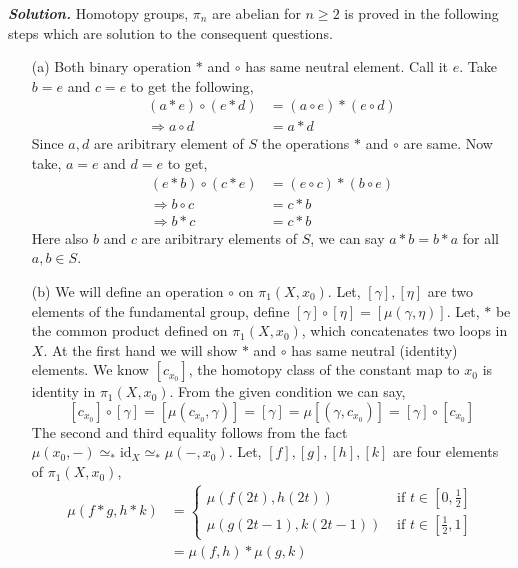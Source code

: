 \documentclass[11pt]{article}
\newcommand{\sol}{ \textbf{\textit{Solution.}} }
\newcommand{\id}{\mathrm{id}}
\begin{document}
 \sol Homotopy groups, $\pi_n$ are abelian for $n \geq 2$ is proved in the following steps which are solution to the consequent questions.

 \begin{itemize}
    \item[(a)] Both binary operation $\ast$ and $\circ$ has same neutral element. Call it $e$. Take $b = e$ and $c=e$ to get the following, 
    \begin{align*}
        (a \ast e) \circ (e \ast d) &= (a \circ e) \ast (e \circ d) \\
        \Rightarrow a \circ d &= a \ast d
    \end{align*}
    Since $a,d$ are aribitrary element of $S$ the operations $\ast$ and $\circ$ are same. Now take, $a = e$ and $d =e$ to get,
    \begin{align*}
        (e \ast b) \circ (c \ast e) &= (e \circ c) \ast (b \circ e) \\
        \Rightarrow b \circ c &= c \ast b\\
        \Rightarrow b\ast c &= c \ast b
    \end{align*}
    Here also $b$ and $c$ are aribitrary elements of $S$, we can say $a \ast b = b \ast a$ for all $a,b \in S$.
    \item[(b)] We will define an operation $\circ$ on $\pi_1(X,x_0)$. Let, $[\gamma], [\eta]$ are two elements of the fundamental group, define $[\gamma] \circ [\eta] = [\mu(\gamma,\eta)]$. Let, $\ast$ be the common product defined on $\pi_1 (X,x_0)$, which concatenates two loops in $X$. At the first hand we will show $\ast$ and $\circ$ has same neutral (identity) elements. We know $[c_{x_0}]$, the homotopy class of the constant map to $x_0$ is identity in $\pi_1(X,x_0)$. From the given condition we can say, $$[c_{x_0}]\circ [\gamma]=[\mu(c_{x_0}, \gamma)] = [\gamma] = \mu[(\gamma,c_{x_0})]=[\gamma]\circ [c_{x_0}]$$
    The second and third equality follows from the fact $\mu(x_0, -) \simeq_* \id_X \simeq_* \mu(-,x_0)$. Let, $[f],[g],[h],[k]$ are four elements of $\pi_1(X,x_0)$, 
    \begin{align*}
       \mu (f\ast g, h\ast k) &= \begin{cases}
        \mu(f(2t),h(2t)) & \text{ if } t\in [0,\frac{1}{2}] \\
        \mu (g(2t-1),k(2t-1)) & \text{ if } t \in [\frac{1}{2},1]
       \end{cases} \\
       &= \mu(f,h) \ast \mu(g,k)
    \end{align*}

\end{itemize}
\end{document}
